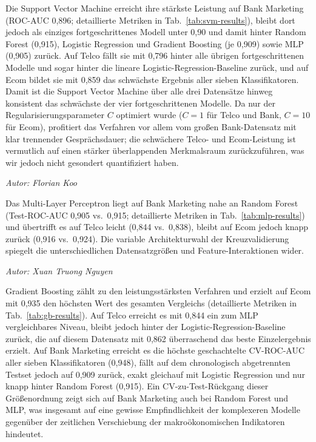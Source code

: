 \documentclass[10pt]{scrartcl}
\begin{document}
Die Support Vector Machine erreicht ihre stärkste Leistung auf Bank Marketing (ROC-AUC 0{,}896; detaillierte Metriken in Tab.~\ref{tab:svm-results}), bleibt dort jedoch als einziges fortgeschrittenes Modell unter 0{,}90 und damit hinter Random Forest (0{,}915), Logistic Regression und Gradient Boosting (je 0{,}909) sowie MLP (0{,}905) zurück. Auf Telco fällt sie mit 0{,}796 hinter alle übrigen fortgeschrittenen Modelle und sogar hinter die lineare Logistic-Regression-Baseline zurück, und auf Ecom bildet sie mit 0{,}859 das schwächste Ergebnis aller sieben Klassifikatoren. Damit ist die Support Vector Machine über alle drei Datensätze hinweg konsistent das schwächste der vier fortgeschrittenen Modelle. Da nur der Regularisierungsparameter $C$ optimiert wurde ($C=1$ für Telco und Bank, $C=10$ für Ecom), profitiert das Verfahren vor allem vom großen Bank-Datensatz mit klar trennender Gesprächsdauer; die schwächere Telco- und Ecom-Leistung ist vermutlich auf einen stärker überlappenden Merkmalsraum zurückzuführen, was wir jedoch nicht gesondert quantifiziert haben.

\begin{flushright}\textit{Autor: Florian Koo}\end{flushright}

Das Multi-Layer Perceptron liegt auf Bank Marketing nahe an Random Forest (Test-ROC-AUC 0{,}905 vs.\ 0{,}915; detaillierte Metriken in Tab.~\ref{tab:mlp-results}) und übertrifft es auf Telco leicht (0{,}844 vs.\ 0{,}838), bleibt auf Ecom jedoch knapp zurück (0{,}916 vs.\ 0{,}924). Die variable Architekturwahl der Kreuzvalidierung spiegelt die unterschiedlichen Datensatzgrößen und Feature-Interaktionen wider.

\begin{flushright}\textit{Autor: Xuan Truong Nguyen}\end{flushright}

Gradient Boosting zählt zu den leistungsstärksten Verfahren und erzielt auf Ecom mit 0{,}935 den höchsten Wert des gesamten Vergleichs (detaillierte Metriken in Tab.~\ref{tab:gb-results}). Auf Telco erreicht es mit 0{,}844 ein zum MLP vergleichbares Niveau, bleibt jedoch hinter der Logistic-Regression-Baseline zurück, die auf diesem Datensatz mit 0{,}862 überraschend das beste Einzelergebnis erzielt. Auf Bank Marketing erreicht es die höchste geschachtelte CV-ROC-AUC aller sieben Klassifikatoren (0{,}948), fällt auf dem chronologisch abgetrennten Testset jedoch auf 0{,}909 zurück, exakt gleichauf mit Logistic Regression und nur knapp hinter Random Forest (0{,}915). Ein CV-zu-Test-Rückgang dieser Größenordnung zeigt sich auf Bank Marketing auch bei Random Forest und MLP, was insgesamt auf eine gewisse Empfindlichkeit der komplexeren Modelle gegenüber der zeitlichen Verschiebung der makroökonomischen Indikatoren hindeutet.
\end{document}
